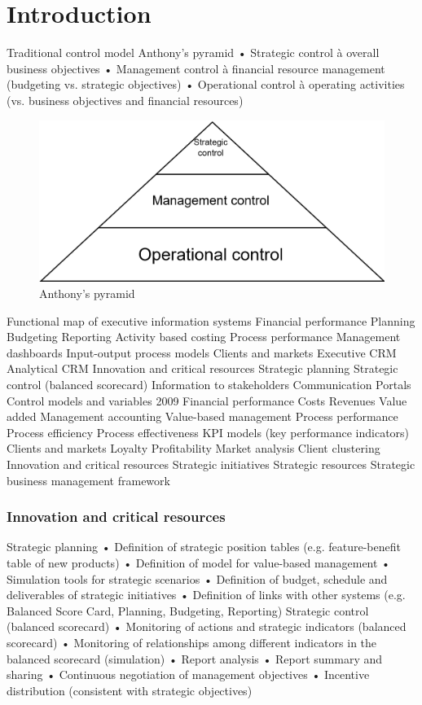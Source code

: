 \section{Introduction}

Traditional control model
Anthony’s pyramid
• Strategic control à overall business
objectives
• Management control à financial
resource management (budgeting vs.
strategic objectives)
• Operational control à operating
activities (vs. business objectives and
financial resources)
\begin{figure}[H]
    \centering
    \includegraphics[width=0.5\linewidth]{images/bis3.png}
    \caption{Anthony’s pyramid}
\end{figure}
Functional map of executive information systems
Financial
performance
Planning
Budgeting
Reporting
Activity based
costing
Process
performance
Management
dashboards
Input-output
process models
Clients and
markets
Executive CRM
Analytical CRM
Innovation
and critical
resources
Strategic
planning
Strategic
control
(balanced
scorecard)
Information
to
stakeholders
Communication
Portals
Control models and variables
2009
Financial
performance
Costs
Revenues
Value added
Management
accounting
Value-based
management
Process
performance
Process
efficiency
Process
effectiveness
KPI models
(key
performance
indicators)
Clients and
markets
Loyalty
Profitability
Market
analysis
Client
clustering
Innovation
and critical
resources
Strategic
initiatives
Strategic
resources
Strategic
business
management
framework

\subsubsection{Innovation and critical resources}
Strategic planning • Definition of strategic position tables (e.g. feature-benefit
table of new products)
• Definition of model for value-based management
• Simulation tools for strategic scenarios
• Definition of budget, schedule and deliverables of strategic
initiatives
• Definition of links with other systems (e.g. Balanced Score
Card, Planning, Budgeting, Reporting)
Strategic control
(balanced
scorecard)
• Monitoring of actions and strategic indicators (balanced
scorecard)
• Monitoring of relationships among different indicators in the
balanced scorecard (simulation)
• Report analysis
• Report summary and sharing
• Continuous negotiation of management objectives
• Incentive distribution (consistent with strategic objectives)
